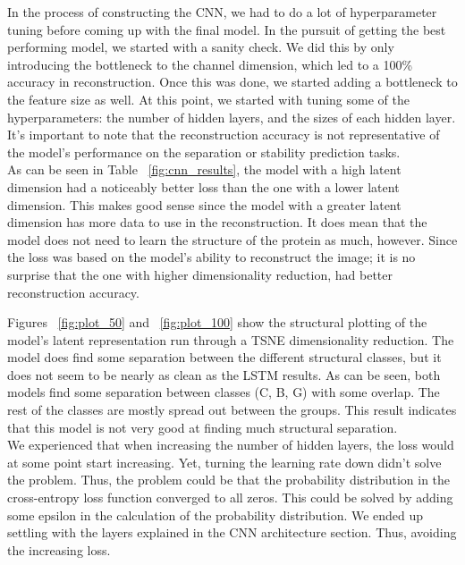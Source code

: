 In the process of constructing the CNN, we had to do a lot of hyperparameter tuning before coming up with the final model. In the pursuit of getting the best performing model, we started with a sanity check. We did this by only introducing the bottleneck to the channel dimension, which led to a 100\% accuracy in reconstruction. Once this was done, we started adding a bottleneck to the feature size as well. At this point, we started with tuning some of the hyperparameters: the number of hidden layers, and the sizes of each hidden layer. \\

\noindent
It's important to note that the reconstruction accuracy is not representative of the model's performance on the separation or stability prediction tasks.\\

\noindent
As can be seen in Table ~\ref{fig:cnn_results}, the model with a high latent dimension had a noticeably better loss than the one with a lower latent dimension. This makes good sense since the model with a greater latent dimension has more data to use in the reconstruction. It does mean that the model does not need to learn the structure of the protein as much, however. Since the loss was based on the model's ability to reconstruct the image; it is no surprise that the one with higher dimensionality reduction, had better reconstruction accuracy.

\noindent
Figures ~\ref{fig:plot_50} and ~\ref{fig:plot_100} show the structural plotting of the model's latent representation run through a TSNE dimensionality reduction. The model does find some separation between the different structural classes, but it does not seem to be nearly as clean as the LSTM results. As can be seen, both models find some separation between classes (C, B, G) with some overlap. The rest of the classes are mostly spread out between the groups. This result indicates that this model is not very good at finding much structural separation. \\

\noindent
We experienced that when increasing the number of hidden layers, the loss would at some point start increasing. Yet, turning the learning rate down didn't solve the problem. Thus, the problem could be that the probability distribution in the cross-entropy loss function converged to all zeros. This could be solved by adding some epsilon in the calculation of the probability distribution. We ended up settling with the layers explained in the CNN architecture section. Thus, avoiding the increasing loss. \\

